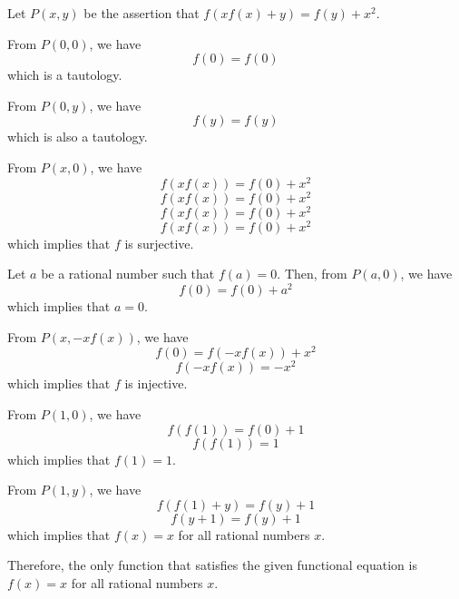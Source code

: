 Let \( P(x,y) \) be the assertion that \( f(xf(x) + y) = f(y) + x^2 \).

From \( P(0,0) \), we have
\[ f(0) = f(0) \]
which is a tautology.

From \( P(0,y) \), we have
\[ f(y) = f(y) \]
which is also a tautology.

From \( P(x,0) \), we have
\[ f(xf(x)) = f(0) + x^2 \]
\[ f(xf(x)) = f(0) + x^2 \]
\[ f(xf(x)) = f(0) + x^2 \]
\[ f(xf(x)) = f(0) + x^2 \]
which implies that \( f \) is surjective.

Let \( a \) be a rational number such that \( f(a) = 0 \). Then, from \( P(a,0) \), we have
\[ f(0) = f(0) + a^2 \]
which implies that \( a = 0 \).

From \( P(x,-xf(x)) \), we have
\[ f(0) = f(-xf(x)) + x^2 \]
\[ f(-xf(x)) = -x^2 \]
which implies that \( f \) is injective.

From \( P(1,0) \), we have
\[ f(f(1)) = f(0) + 1 \]
\[ f(f(1)) = 1 \]
which implies that \( f(1) = 1 \).

From \( P(1,y) \), we have
\[ f(f(1) + y) = f(y) + 1 \]
\[ f(y + 1) = f(y) + 1 \]
which implies that \( f(x) = x \) for all rational numbers \( x \).

Therefore, the only function that satisfies the given functional equation is \( f(x) = x \) for all rational numbers \( x \).
